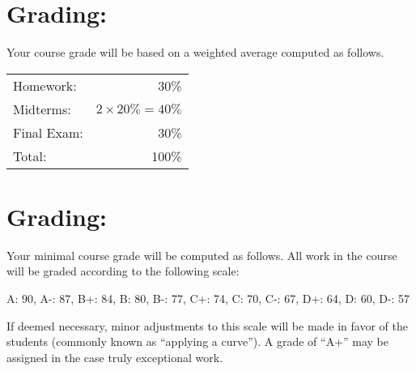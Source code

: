 \documentclass[margin]{res}
\theoremstyle{plain}
\theoremstyle{definition}
\theoremstyle{remark}
\begin{document}
\begin{resume}
\pagebreak

\section{Grading:}
Your course grade will be based on a weighted average computed as follows.
\begin{center}
\begin{tabular}{| l  r  |}\hline
Homework:   & 30\%                 \\
Midterms:   & $2\times20\% = 40\%$ \\
Final Exam: & 30\%                 \\
Total:      & 100\%                \\ \hline
\end{tabular}
\end{center}

\section{Grading:}
Your minimal course grade will be computed as follows. All work in the course will be graded according to the following scale:

A: 90,
A-: 87,
B+: 84,
B: 80,
B-: 77,
C+: 74,
C: 70,
C-: 67,
D+: 64,
D: 60,
D-: 57


If deemed necessary, minor adjustments to this scale will be made in favor of the students (commonly known as ``applying a curve'').  A grade of ``A+'' may be assigned in the case truly exceptional work.





\end{resume}
\end{document}
